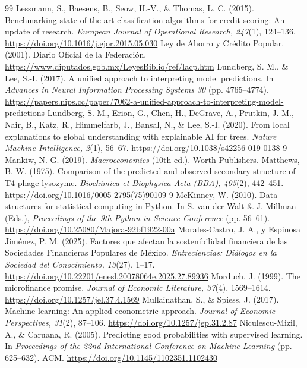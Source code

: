 \begin{thebibliography}{99}
 Lessmann, S., Baesens, B., Seow, H.-V., \& Thomas, L. C. (2015). Benchmarking state-of-the-art classification algorithms for credit scoring: An update of research. \textit{European Journal of Operational Research, 247}(1), 124--136. \url{https://doi.org/10.1016/j.ejor.2015.05.030}
 Ley de Ahorro y Crédito Popular. (2001). Diario Oficial de la Federación. \url{https://www.diputados.gob.mx/LeyesBiblio/ref/lacp.htm}
 Lundberg, S. M., \& Lee, S.-I. (2017). A unified approach to interpreting model predictions. In \textit{Advances in Neural Information Processing Systems 30} (pp. 4765--4774). \url{https://papers.nips.cc/paper/7062-a-unified-approach-to-interpreting-model-predictions}
 Lundberg, S. M., Erion, G., Chen, H., DeGrave, A., Prutkin, J. M., Nair, B., Katz, R., Himmelfarb, J., Bansal, N., \& Lee, S.-I. (2020). From local explanations to global understanding with explainable AI for trees. \textit{Nature Machine Intelligence, 2}(1), 56--67. \url{https://doi.org/10.1038/s42256-019-0138-9}
 Mankiw, N. G. (2019). \textit{Macroeconomics} (10th ed.). Worth Publishers.%
 Matthews, B. W. (1975). Comparison of the predicted and observed secondary structure of T4 phage lysozyme. \textit{Biochimica et Biophysica Acta (BBA), 405}(2), 442--451. \url{https://doi.org/10.1016/0005-2795(75)90109-9}
 McKinney, W. (2010). Data structures for statistical computing in Python. In S. van der Walt \& J. Millman (Eds.), \textit{Proceedings of the 9th Python in Science Conference} (pp. 56--61). \url{https://doi.org/10.25080/Majora-92bf1922-00a}
 Morales-Castro, J. A., y Espinosa Jiménez, P. M. (2025). Factores que afectan la sostenibilidad financiera de las Sociedades Financieras Populares de México. \textit{Entreciencias: Diálogos en la Sociedad del Conocimiento, 13}(27), 1--17. \url{https://doi.org/10.22201/enesl.20078064e.2025.27.89936}
 Morduch, J. (1999). The microfinance promise. \textit{Journal of Economic Literature, 37}(4), 1569--1614. \url{https://doi.org/10.1257/jel.37.4.1569}
 Mullainathan, S., \& Spiess, J. (2017). Machine learning: An applied econometric approach. \textit{Journal of Economic Perspectives, 31}(2), 87--106. \url{https://doi.org/10.1257/jep.31.2.87}
 Niculescu-Mizil, A., \& Caruana, R. (2005). Predicting good probabilities with supervised learning. In \textit{Proceedings of the 22nd International Conference on Machine Learning} (pp. 625--632). ACM. \url{https://doi.org/10.1145/1102351.1102430}

\end{thebibliography}
